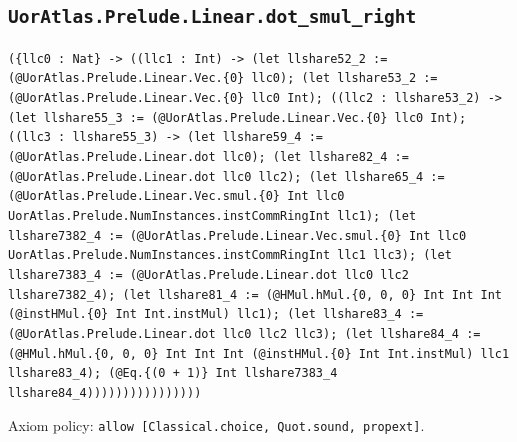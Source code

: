 \documentclass[11pt]{article}
\begin{document}
\subsection*{\texttt{UorAtlas.Prelude.Linear.dot\_smul\_right}}
\noindent\texttt{(\{llc0 : Nat\} -> ((llc1 : Int) -> (let llshare52\_2 := (@UorAtlas.Prelude.Linear.Vec.\{0\} llc0); (let llshare53\_2 := (@UorAtlas.Prelude.Linear.Vec.\{0\} llc0 Int); ((llc2 : llshare53\_2) -> (let llshare55\_3 := (@UorAtlas.Prelude.Linear.Vec.\{0\} llc0 Int); ((llc3 : llshare55\_3) -> (let llshare59\_4 := (@UorAtlas.Prelude.Linear.dot llc0); (let llshare82\_4 := (@UorAtlas.Prelude.Linear.dot llc0 llc2); (let llshare65\_4 := (@UorAtlas.Prelude.Linear.Vec.smul.\{0\} Int llc0 UorAtlas.Prelude.NumInstances.instCommRingInt llc1); (let llshare7382\_4 := (@UorAtlas.Prelude.Linear.Vec.smul.\{0\} Int llc0 UorAtlas.Prelude.NumInstances.instCommRingInt llc1 llc3); (let llshare7383\_4 := (@UorAtlas.Prelude.Linear.dot llc0 llc2 llshare7382\_4); (let llshare81\_4 := (@HMul.hMul.\{0, 0, 0\} Int Int Int (@instHMul.\{0\} Int Int.instMul) llc1); (let llshare83\_4 := (@UorAtlas.Prelude.Linear.dot llc0 llc2 llc3); (let llshare84\_4 := (@HMul.hMul.\{0, 0, 0\} Int Int Int (@instHMul.\{0\} Int Int.instMul) llc1 llshare83\_4); (@Eq.\{(0 + 1)\} Int llshare7383\_4 llshare84\_4))))))))))))))))}\par
\noindent Axiom policy: \texttt{allow [Classical.choice, Quot.sound, propext]}.\par
\end{document}

